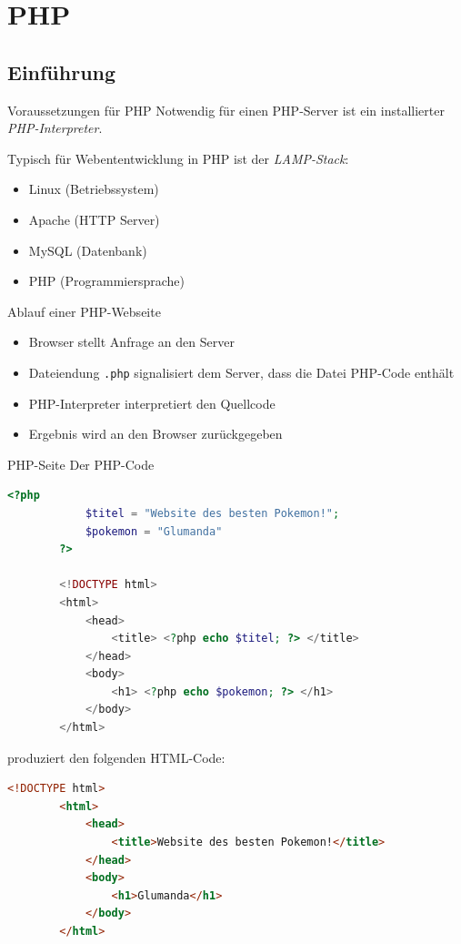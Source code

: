\section{PHP}

\subsection{Einführung}

\begin{bonus}{Voraussetzungen für PHP}
    Notwendig für einen PHP-Server ist ein installierter \emph{PHP-Interpreter}.

    Typisch für Webententwicklung in PHP ist der \emph{LAMP-Stack}:
    \begin{itemize}
        \item Linux (Betriebssystem)
        \item Apache (HTTP Server)
        \item MySQL (Datenbank)
        \item PHP (Programmiersprache)
    \end{itemize}
\end{bonus}

\begin{defi}{Ablauf einer PHP-Webseite}
    \begin{itemize}
        \item Browser stellt Anfrage an den Server
        \item Dateiendung \texttt{.php} signalisiert dem Server, dass die Datei PHP-Code enthält
        \item PHP-Interpreter interpretiert den Quellcode
        \item Ergebnis wird an den Browser zurückgegeben
    \end{itemize}
\end{defi}

\begin{example}{PHP-Seite}
    Der PHP-Code
    \begin{lstlisting}[language=php,alsolanguage=html]
        <?php
            $titel = "Website des besten Pokemon!";
            $pokemon = "Glumanda"
        ?>

        <!DOCTYPE html>
        <html>
            <head>
                <title> <?php echo $titel; ?> </title>
            </head>
            <body>
                <h1> <?php echo $pokemon; ?> </h1>
            </body>
        </html>
    \end{lstlisting}

    produziert den folgenden HTML-Code:
    \begin{lstlisting}[language=html]
        <!DOCTYPE html>
        <html>
            <head>
                <title>Website des besten Pokemon!</title>
            </head>
            <body>
                <h1>Glumanda</h1>
            </body>
        </html>
    \end{lstlisting}
\end{example}

